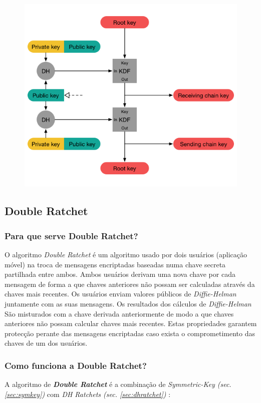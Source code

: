 \begin{figure}[H]
\begin{center}
\includegraphics[width=12cm]{img/DH7.png}
\caption{}
\label{diagram:DH7}
\centering
\end{center}
\end{figure}

\subsection{Double Ratchet}\label{sec:DoubleRatchet}
\subsubsection{Para que serve Double Ratchet?}
O algoritmo \emph{Double Ratchet} é um algoritmo usado por dois usuários (aplicação móvel) na troca de mensagens encriptadas baseadas numa chave secreta partilhada entre ambos. Ambos usuários derivam uma nova chave por cada mensagem de forma a que chaves anteriores não possam ser calculadas através da chaves mais recentes. Os usuários enviam valores públicos de \emph{Diffie-Helman} juntamente com as suas mensagens. Os resultados dos cálculos de \emph{Diffie-Helman} São misturados com a chave derivada anteriormente de modo a que chaves anteriores não possam calcular chaves mais recentes. Estas propriedades garantem protecção perante das mensagens encriptadas caso exista o comprometimento das chaves de um dos usuários.

\subsubsection{Como funciona a Double Ratchet?}
A algoritmo de \textit{\textbf{Double Ratchet}} é a combinação de \textit{Symmetric-Key (sec.\ref{sec:symkey})} com \textit{DH Ratchets (sec. \ref{sec:dhratchet})} :

